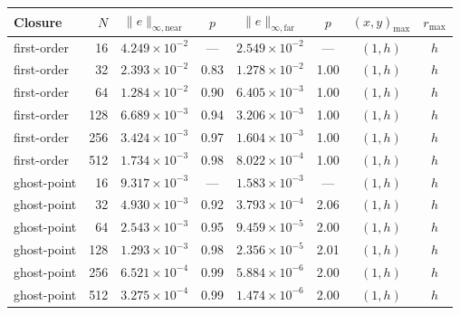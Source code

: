 \begin{tabular}{@{}lrcccccc@{}}\toprule
Closure & $N$ & $\|e\|_{\infty,\mathrm{near}}$ & $p$ & $\|e\|_{\infty,\mathrm{far}}$ & $p$ & $(x,y)_{\max}$ & $r_{\max}$\\\midrule
first-order & 16 & $4.249\times10^{-2}$ & --- & $2.549\times10^{-2}$ & --- & $(1,h)$ & $h$\\
first-order & 32 & $2.393\times10^{-2}$ & 0.83 & $1.278\times10^{-2}$ & 1.00 & $(1,h)$ & $h$\\
first-order & 64 & $1.284\times10^{-2}$ & 0.90 & $6.405\times10^{-3}$ & 1.00 & $(1,h)$ & $h$\\
first-order & 128 & $6.689\times10^{-3}$ & 0.94 & $3.206\times10^{-3}$ & 1.00 & $(1,h)$ & $h$\\
first-order & 256 & $3.424\times10^{-3}$ & 0.97 & $1.604\times10^{-3}$ & 1.00 & $(1,h)$ & $h$\\
first-order & 512 & $1.734\times10^{-3}$ & 0.98 & $8.022\times10^{-4}$ & 1.00 & $(1,h)$ & $h$\\
\midrule
ghost-point & 16 & $9.317\times10^{-3}$ & --- & $1.583\times10^{-3}$ & --- & $(1,h)$ & $h$\\
ghost-point & 32 & $4.930\times10^{-3}$ & 0.92 & $3.793\times10^{-4}$ & 2.06 & $(1,h)$ & $h$\\
ghost-point & 64 & $2.543\times10^{-3}$ & 0.95 & $9.459\times10^{-5}$ & 2.00 & $(1,h)$ & $h$\\
ghost-point & 128 & $1.293\times10^{-3}$ & 0.98 & $2.356\times10^{-5}$ & 2.01 & $(1,h)$ & $h$\\
ghost-point & 256 & $6.521\times10^{-4}$ & 0.99 & $5.884\times10^{-6}$ & 2.00 & $(1,h)$ & $h$\\
ghost-point & 512 & $3.275\times10^{-4}$ & 0.99 & $1.474\times10^{-6}$ & 2.00 & $(1,h)$ & $h$\\
\bottomrule
\end{tabular}
